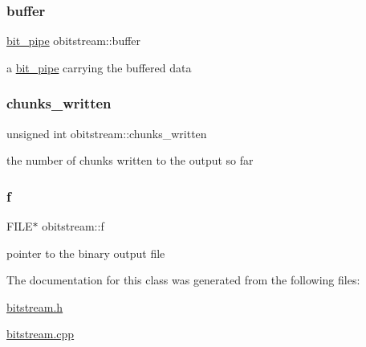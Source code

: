 \subsubsection{\texorpdfstring{buffer}{buffer}}
{\footnotesize\ttfamily \hyperlink{classbit__pipe}{bit\+\_\+pipe} obitstream\+::buffer\hspace{0.3cm}{\ttfamily [private]}}



a \hyperlink{classbit__pipe}{bit\+\_\+pipe} carrying the buffered data 

\mbox{\label{classobitstream_a3022397f2b6133ea5990016d9d078a2f}} 
\subsubsection{\texorpdfstring{chunks\+\_\+written}{chunks\_written}}
{\footnotesize\ttfamily unsigned int obitstream\+::chunks\+\_\+written\hspace{0.3cm}{\ttfamily [private]}}



the number of chunks written to the output so far 

\mbox{\label{classobitstream_ac589d74745217748c888ae777ab324a7}} 
\subsubsection{\texorpdfstring{f}{f}}
{\footnotesize\ttfamily F\+I\+LE$\ast$ obitstream\+::f\hspace{0.3cm}{\ttfamily [private]}}

pointer to the binary output file 

The documentation for this class was generated from the following files\+:\begin{DoxyCompactItemize}
\item 
\hyperlink{bitstream_8h}{bitstream.\+h}\item 
\hyperlink{bitstream_8cpp}{bitstream.\+cpp}\end{DoxyCompactItemize}
